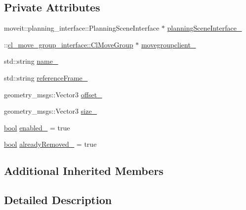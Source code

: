 \subsection*{Private Attributes}
\begin{DoxyCompactItemize}
\item 
moveit\+::planning\+\_\+interface\+::\+Planning\+Scene\+Interface $\ast$ \hyperlink{classsm__moveit__wine__serve_1_1cl__move__group__interface_1_1CpConstraintVirtualSideWall_ae3bb8a018ebf8b85621e23f4093a07e9}{planning\+Scene\+Interface\+\_\+}
\item 
\+::\hyperlink{classcl__move__group__interface_1_1ClMoveGroup}{cl\+\_\+move\+\_\+group\+\_\+interface\+::\+Cl\+Move\+Group} $\ast$ \hyperlink{classsm__moveit__wine__serve_1_1cl__move__group__interface_1_1CpConstraintVirtualSideWall_ab25adb3d9fa43c9b9bfbad41379b7247}{movegroupclient\+\_\+}
\item 
std\+::string \hyperlink{classsm__moveit__wine__serve_1_1cl__move__group__interface_1_1CpConstraintVirtualSideWall_abe1e7ae9ca5d54953ffaaa8d85ff16ac}{name\+\_\+}
\item 
std\+::string \hyperlink{classsm__moveit__wine__serve_1_1cl__move__group__interface_1_1CpConstraintVirtualSideWall_a832273800ad6780a7b3cd35bc58e4e75}{reference\+Frame\+\_\+}
\item 
geometry\+\_\+msgs\+::\+Vector3 \hyperlink{classsm__moveit__wine__serve_1_1cl__move__group__interface_1_1CpConstraintVirtualSideWall_a15fabbe74d1611af8c7c88ee580b30f6}{offset\+\_\+}
\item 
geometry\+\_\+msgs\+::\+Vector3 \hyperlink{classsm__moveit__wine__serve_1_1cl__move__group__interface_1_1CpConstraintVirtualSideWall_af00e8ef9042a797b749888256e0d36f4}{size\+\_\+}
\item 
\hyperlink{classbool}{bool} \hyperlink{classsm__moveit__wine__serve_1_1cl__move__group__interface_1_1CpConstraintVirtualSideWall_a41d715b981297010db4d8760244b2e8c}{enabled\+\_\+} = true
\item 
\hyperlink{classbool}{bool} \hyperlink{classsm__moveit__wine__serve_1_1cl__move__group__interface_1_1CpConstraintVirtualSideWall_a18d4b515ae9f0ce6478f9e205431f06d}{already\+Removed\+\_\+} = true
\end{DoxyCompactItemize}
\subsection*{Additional Inherited Members}


\subsection{Detailed Description}


